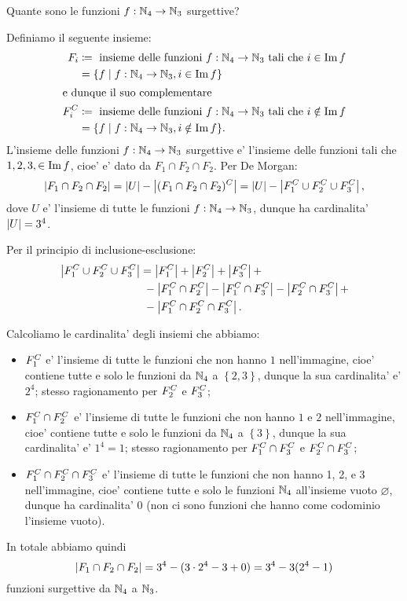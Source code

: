 \begin{example}
    Quante sono le funzioni $f : \mathbb{N}_4 \to \mathbb{N}_3$ surgettive?
\end{example}
\begin{solution}
    Definiamo il seguente insieme: 
    \begin{alignat*}{1}
        F_i &\coloneqq \text{ insieme delle funzioni $f : \mathbb{N}_4 \to \mathbb{N}_3$ tali che $i \in \operatorname{Im} f$} \\
        &= \{ f \mid f : \mathbb{N}_4 \to \mathbb{N}_3, i \in \operatorname{Im} f\}\\
        \intertext{e dunque il suo complementare}
        F_i^C &\coloneqq \text{ insieme delle funzioni $f : \mathbb{N}_4 \to \mathbb{N}_3$ tali che $i \notin \operatorname{Im} f$} \\
        &= \{ f \mid f : \mathbb{N}_4 \to \mathbb{N}_3, i \notin \operatorname{Im} f\}.
    \end{alignat*}
    L'insieme delle funzioni $f : \mathbb{N}_4 \to \mathbb{N}_3$ surgettive e' l'insieme delle funzioni tali che $1, 2, 3, \in \operatorname{Im} f$, cioe' e' dato da $F_1 \cap F_2 \cap F_2$. Per De Morgan: \[
        \left|F_1 \cap F_2 \cap F_2\right| = \left|U\right| - \left|(F_1 \cap F_2 \cap F_2)^C\right|  = \left|U\right| - \left|F_1^C \cup F_2^C \cup F_3^C\right|,
    \] dove $U$ e' l'insieme di tutte le funzioni $f : \mathbb{N}_4 \to \mathbb{N}_3$, dunque ha cardinalita' $\left|U\right| = 3^4$.

    Per il principio di inclusione-esclusione:
    \begin{alignat*}
        {1}
        \left|F_1^C \cup F_2^C \cup F_3^C\right| &= \left|F_1^C\right| + \left|F_2^C\right| + \left|F_3^C\right| +\\
        &\ - \left|F_1^C \cap F_2^C\right| - \left|F_1^C \cap F_3^C\right| - \left|F_2^C \cap F_3^C\right| + \\
        &\ - \left|F_1^C \cap F_2^C \cap F_3^C\right|.
    \end{alignat*}
\end{solution}

Calcoliamo le cardinalita' degli insiemi che abbiamo:
\begin{itemize}
    \item $F_1^C$ e' l'insieme di tutte le funzioni che non hanno $1$ nell'immagine, cioe' contiene tutte e solo le funzioni da $\mathbb{N}_4$ a $\left\{ 2, 3\right\}$, dunque la sua cardinalita' e' $2^4$; stesso ragionamento per $F_2^C$ e $F_3^C$;
    \item $F_1^C \cap F_2^C$ e' l'insieme di tutte le funzioni che non hanno $1$ e $2$ nell'immagine, cioe' contiene tutte e solo le funzioni da $\mathbb{N}_4$ a $\left\{ 3\right\}$, dunque la sua cardinalita' e' $1^4 = 1$; stesso ragionamento per $F_1^C \cap F_3^C$ e $F_2^C \cap F_3^C$;
    \item $F_1^C \cap F_2^C \cap F_3^C$ e' l'insieme di tutte le funzioni che non hanno 1, 2, e 3 nell'immagine, cioe' contiene tutte e solo le funzioni $\mathbb{N}_4$ all'insieme vuoto $\varnothing$, dunque ha cardinalita' 0 (non ci sono funzioni che hanno come codominio l'insieme vuoto).
\end{itemize}

In totale abbiamo quindi \[
    \left|F_1 \cap F_2 \cap F_2\right| = 3^4 - (3\cdot2^4 - 3 + 0) = 3^4 - 3(2^4 - 1)    
\] funzioni surgettive da $\mathbb{N}_4$ a $\mathbb{N}_3$.